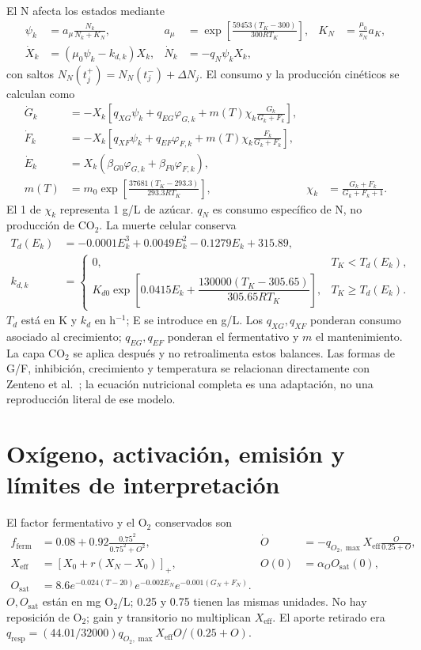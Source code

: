 \documentclass[10pt,a4paper]{article}
\newcommand{\qr}{q_{\mathrm{resp}}}
\newcommand{\ff}{f_{\mathrm{ferm}}}
\newcommand{\pos}[1]{\left[#1\right]_+}
\begin{document}
El N afecta los estados mediante
\begin{align}
\psi_k&=a_\mu\frac{N_k}{N_k+K_N},&
a_\mu&=\exp\!\left[\frac{59453(T_K-300)}{300RT_K}\right],&
K_N&=\frac{\mu_0}{s_N}a_K,\label{eq:mu}\\
\dot X_k&=(\mu_0\psi_k-k_{d,k})X_k,&
\dot N_k&=-q_N\psi_kX_k,\label{eq:XN}
\end{align}
con saltos $N_N(t_j^+)=N_N(t_j^-)+\Delta N_j$. El consumo y la producción
cinéticos se calculan como
\begin{align}
\dot G_k&=-X_k\left[q_{XG}\psi_k+q_{EG}\varphi_{G,k}
+m(T)\chi_k\frac{G_k}{G_k+F_k}\right],\label{eq:G}\\
\dot F_k&=-X_k\left[q_{XF}\psi_k+q_{EF}\varphi_{F,k}
+m(T)\chi_k\frac{F_k}{G_k+F_k}\right],\label{eq:F}\\
\dot E_k&=X_k(\beta_{G0}\varphi_{G,k}+\beta_{F0}\varphi_{F,k}),\label{eq:E}\\
m(T)&=m_0\exp\!\left[\frac{37681(T_K-293.3)}{293.3RT_K}\right],&
\chi_k&=\frac{G_k+F_k}{G_k+F_k+1}.\label{eq:maintenance}
\end{align}
El 1 de $\chi_k$ representa 1 g/L de azúcar. $q_N$ es consumo específico de N,
no producción de CO\(_2\). La muerte celular conserva
\begin{align}
T_d(E_k)&=-0.0001E_k^3+0.0049E_k^2-0.1279E_k+315.89,\label{eq:Td}\\
k_{d,k}&=\begin{cases}
0,&T_K<T_d(E_k),\\
K_{d0}\exp\!\left[0.0415E_k+
\dfrac{130000(T_K-305.65)}{305.65RT_K}\right],&T_K\ge T_d(E_k).
\end{cases}\label{eq:kd}
\end{align}
$T_d$ está en K y $k_d$ en h$^{-1}$; E se introduce en g/L.
Los $q_{XG},q_{XF}$ ponderan consumo asociado al crecimiento;
$q_{EG},q_{EF}$ ponderan el fermentativo y $m$ el mantenimiento.
La capa CO\(_2\) se aplica después y no retroalimenta estos balances.
Las formas de G/F, inhibición, crecimiento y temperatura se relacionan
directamente con Zenteno et al.~\cite{zenteno}; la ecuación nutricional
completa es una adaptación, no una reproducción literal de ese modelo.

\clearpage
\section{Oxígeno, activación, emisión y límites de interpretación}

El factor fermentativo y el O\(_2\) conservados son
\begin{align}
\ff&=0.08+0.92\frac{0.75^2}{0.75^2+O^2},&
\dot O&=-q_{O_2,\max}X_{\mathrm{eff}}\frac{O}{0.25+O},\label{eq:O}\\
X_{\mathrm{eff}}&=\pos{X_0+r(X_N-X_0)},&
O(0)&=\alpha_O O_{\mathrm{sat}}(0),\label{eq:Xeff}\\
O_{\mathrm{sat}}&=8.6e^{-0.024(T-20)}e^{-0.002E_N}e^{-0.001(G_N+F_N)}.
\label{eq:Osat}
\end{align}
$O,O_{\mathrm{sat}}$ están en mg O\(_2\)/L; 0.25 y 0.75 tienen las mismas
unidades. No hay reposición de O\(_2\); gain y transitorio no multiplican
$X_{\mathrm{eff}}$. El aporte retirado era
$\qr=(44.01/32000)q_{O_2,\max}X_{\mathrm{eff}}O/(0.25+O)$.
\end{document}
